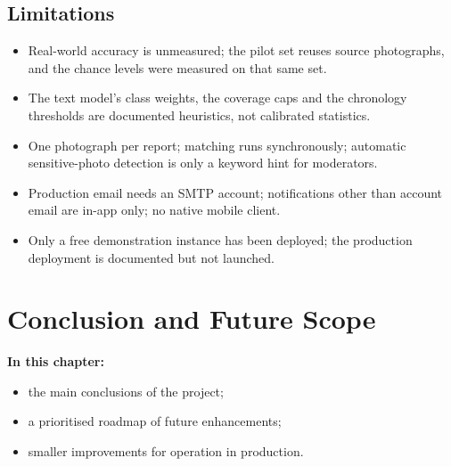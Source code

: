 \documentclass[12pt,a4paper,oneside]{report}
\begin{document}
\section{Limitations}
\begin{itemize}
  \item Real-world accuracy is unmeasured; the pilot set reuses source photographs, and the chance levels were measured on that same set.
  \item The text model's class weights, the coverage caps and the chronology thresholds are documented heuristics, not calibrated statistics.
  \item One photograph per report; matching runs synchronously; automatic sensitive-photo detection is only a keyword hint for moderators.
  \item Production email needs an SMTP account; notifications other than account email are in-app only; no native mobile client.
  \item Only a free demonstration instance has been deployed; the production deployment is documented but not launched.
\end{itemize}

\chapter{Conclusion and Future Scope}
\textbf{In this chapter:}
\begin{itemize}[beginpenalty=10000]
  \item the main conclusions of the project;
  \item a prioritised roadmap of future enhancements;
  \item smaller improvements for operation in production.
\end{itemize}
\end{document}
